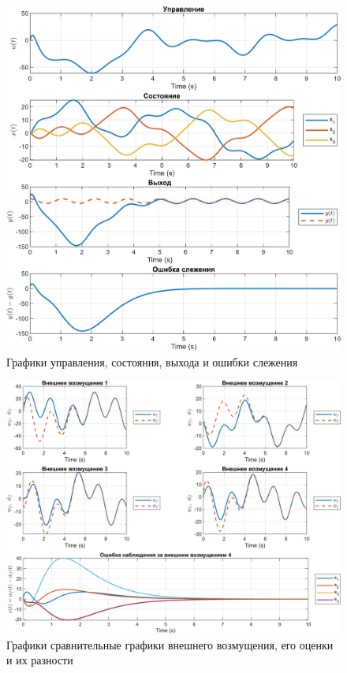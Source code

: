 \begin{figure}[H]
    \centering
    \includegraphics[width=\linewidth]{figs/32_sim.png}
    \caption{Графики управления, состояния, выхода и ошибки слежения}
    \label{fig:32_sim}
\end{figure}

\begin{figure}[H]
    \centering
    \includegraphics[width=\linewidth]{figs/33_sim.png}
    \caption{Графики  сравнительные графики внешнего возмущения,
    его оценки и их разности}
    \label{fig:33_sim}
\end{figure}



